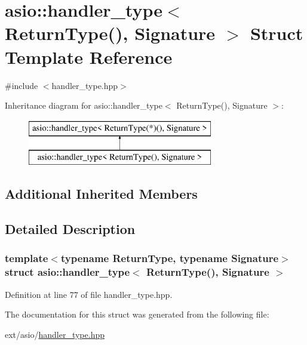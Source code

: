\hypertarget{structasio_1_1handler__type_3_01_return_type_07_08_00_01_signature_01_4}{}\section{asio\+:\+:handler\+\_\+type$<$ Return\+Type(), Signature $>$ Struct Template Reference}
\label{structasio_1_1handler__type_3_01_return_type_07_08_00_01_signature_01_4}


{\ttfamily \#include $<$handler\+\_\+type.\+hpp$>$}

Inheritance diagram for asio\+:\+:handler\+\_\+type$<$ Return\+Type(), Signature $>$\+:\begin{figure}[H]
\begin{center}
\leavevmode
\includegraphics[height=2.000000cm]{structasio_1_1handler__type_3_01_return_type_07_08_00_01_signature_01_4}
\end{center}
\end{figure}
\subsection*{Additional Inherited Members}


\subsection{Detailed Description}
\subsubsection*{template$<$typename Return\+Type, typename Signature$>$struct asio\+::handler\+\_\+type$<$ Return\+Type(), Signature $>$}



Definition at line 77 of file handler\+\_\+type.\+hpp.



The documentation for this struct was generated from the following file\+:\begin{DoxyCompactItemize}
\item 
ext/asio/\hyperlink{handler__type_8hpp}{handler\+\_\+type.\+hpp}\end{DoxyCompactItemize}
